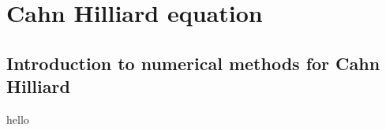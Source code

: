 
\newpage
\section{Cahn Hilliard equation }%
\label{sec:cahn_hilliard_equation}


\subsection{Introduction to numerical methods for Cahn Hilliard}%
\label{sub:introduction_to_numerical_methods_for_cahn_hilliard}

hello




\newpage

